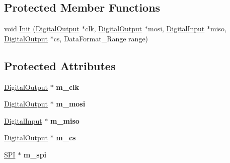 \subsection*{Protected Member Functions}
\begin{DoxyCompactItemize}
\item 
void \hyperlink{classADXL345__SPI_affcf958cfc98994ea18a796832902ace}{Init} (\hyperlink{classDigitalOutput}{DigitalOutput} $\ast$clk, \hyperlink{classDigitalOutput}{DigitalOutput} $\ast$mosi, \hyperlink{classDigitalInput}{DigitalInput} $\ast$miso, \hyperlink{classDigitalOutput}{DigitalOutput} $\ast$cs, DataFormat\_\-Range range)
\end{DoxyCompactItemize}
\subsection*{Protected Attributes}
\begin{DoxyCompactItemize}
\item 
\hypertarget{classADXL345__SPI_a4f24d4c77ac13f38eb46ba7ad1e2e5ba}{
\hyperlink{classDigitalOutput}{DigitalOutput} $\ast$ {\bfseries m\_\-clk}}
\label{classADXL345__SPI_a4f24d4c77ac13f38eb46ba7ad1e2e5ba}

\item 
\hypertarget{classADXL345__SPI_ac416e3fe7c6324d86ac3707f21ac05fb}{
\hyperlink{classDigitalOutput}{DigitalOutput} $\ast$ {\bfseries m\_\-mosi}}
\label{classADXL345__SPI_ac416e3fe7c6324d86ac3707f21ac05fb}

\item 
\hypertarget{classADXL345__SPI_a4d5b0c98d4f5478d23c59d0a8c03608c}{
\hyperlink{classDigitalInput}{DigitalInput} $\ast$ {\bfseries m\_\-miso}}
\label{classADXL345__SPI_a4d5b0c98d4f5478d23c59d0a8c03608c}

\item 
\hypertarget{classADXL345__SPI_acd83d71262f368c3601a745fa39be3bb}{
\hyperlink{classDigitalOutput}{DigitalOutput} $\ast$ {\bfseries m\_\-cs}}
\label{classADXL345__SPI_acd83d71262f368c3601a745fa39be3bb}

\item 
\hypertarget{classADXL345__SPI_a9173d0f036436b4dd7ce1a7a4bab7067}{
\hyperlink{classSPI}{SPI} $\ast$ {\bfseries m\_\-spi}}
\label{classADXL345__SPI_a9173d0f036436b4dd7ce1a7a4bab7067}

\end{DoxyCompactItemize}
